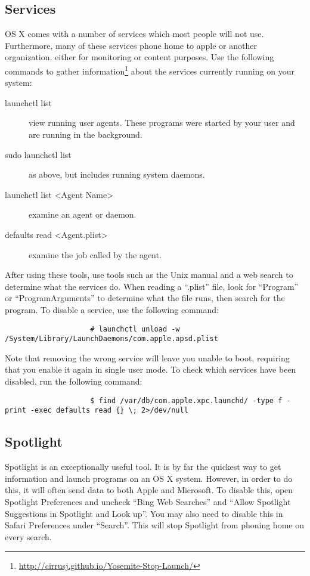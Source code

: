 			\subsection{Services}
				OS X comes with a number of services which most people will not use.
				Furthermore, many of these services phone home to apple or another organization, either for monitoring or content purposes.
				Use the following commands to gather information\footnote{\url{http://cirrusj.github.io/Yosemite-Stop-Launch/}} about the services currently running on your system:
				\begin{description}
					\item[launchctl list]
						view running user agents.
						These programs were started by your user and are running in the background.
					\item[sudo launchctl list]
						as above, but includes running system daemons.
					\item[launchctl list <Agent Name>]
						examine an agent or daemon.
					\item[defaults read <Agent.plist>]
						examine the job called by the agent.
				\end{description}
				After using these tools, use tools such as the Unix manual and a web search to determine what the services do.
				When reading a ``.plist'' file, look for ``Program'' or ``ProgramArguments'' to determine what the file runs, then search for the program.
				To disable a service, use the following command:
				\begin{verbatim}
					# launchctl unload -w /System/Library/LaunchDaemons/com.apple.apsd.plist
				\end{verbatim}
				Note that removing the wrong service will leave you unable to boot, requiring that you enable it again in single user mode.
				To check which services have been disabled, run the following command:
				\begin{verbatim}
					$ find /var/db/com.apple.xpc.launchd/ -type f -print -exec defaults read {} \; 2>/dev/null
				\end{verbatim}
			\subsection{Spotlight}
				Spotlight is an exceptionally useful tool.
				It is by far the quickest way to get information and launch programs on an OS X system.
				However, in order to do this, it will often send data to both Apple and Microsoft.
				To disable this, open Spotlight Preferences and uncheck ``Bing Web Searches'' and ``Allow Spotlight Suggestions in Spotlight and Look up''.
				You may also need to disable this in Safari Preferences under ``Search''.
				This will stop Spotlight from phoning home on every search.
